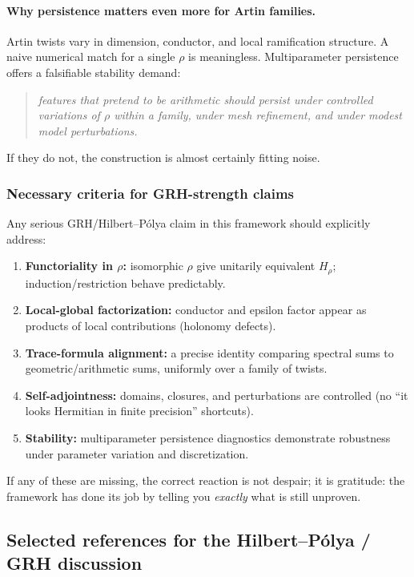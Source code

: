 \documentclass[11pt,oneside]{amsbook}
\numberwithin{equation}{section}
\theoremstyle{plain}
\theoremstyle{definition}
\theoremstyle{remark}
\begin{document}
\paragraph{Why persistence matters even more for Artin families.}
Artin twists vary in dimension, conductor, and local ramification structure.
A naive numerical match for a single $\rho$ is meaningless.
Multiparameter persistence offers a falsifiable stability demand:
\begin{quote}
\emph{features that pretend to be arithmetic should persist under controlled variations of $\rho$ within a family, under mesh refinement, and under modest model perturbations.}
\end{quote}
If they do not, the construction is almost certainly fitting noise.

\subsubsection{Necessary criteria for GRH-strength claims}

Any serious GRH/Hilbert--Pólya claim in this framework should explicitly address:

\begin{enumerate}[label=(\Alph*)]
\item \textbf{Functoriality in $\rho$:} isomorphic $\rho$ give unitarily equivalent $H_\rho$; induction/restriction behave predictably.
\item \textbf{Local-global factorization:} conductor and epsilon factor appear as products of local contributions (holonomy defects).
\item \textbf{Trace-formula alignment:} a precise identity comparing spectral sums to geometric/arithmetic sums, uniformly over a family of twists.
\item \textbf{Self-adjointness:} domains, closures, and perturbations are controlled (no ``it looks Hermitian in finite precision'' shortcuts).
\item \textbf{Stability:} multiparameter persistence diagnostics demonstrate robustness under parameter variation and discretization.
\end{enumerate}

If any of these are missing, the correct reaction is not despair; it is gratitude:
the framework has done its job by telling you \emph{exactly} what is still unproven.

\subsection*{Selected references for the Hilbert--Pólya / GRH discussion}
\end{document}
